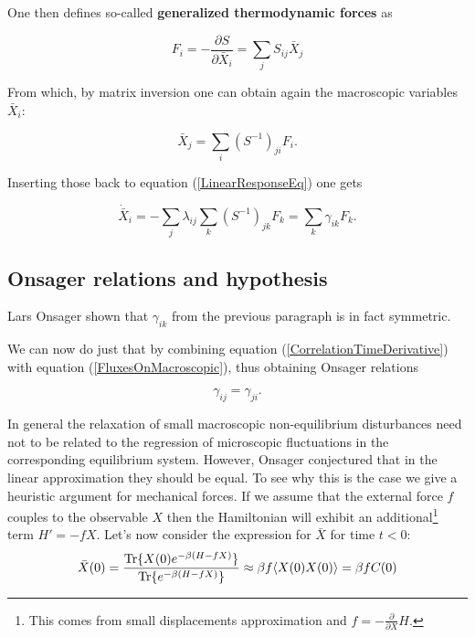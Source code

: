 \documentclass[a4paper,12pt]{article}
\begin{document}
One then defines so-called \textbf{generalized thermodynamic forces} as

\begin{equation}
  F_i= -\frac{\partial{S}}{\partial{\bar{X}_i}}= \sum_j S_{ij}\bar{X}_j
\end{equation}

From which, by matrix inversion one can obtain again the macroscopic variables $\bar{X}_i$:

\begin{equation}
  \bar{X}_j = \sum_i (S^{-1})_{ji} F_i.
\end{equation}


Inserting those back to equation (\ref{LinearResponseEq}) one gets

\begin{equation}
\label{FluxesOnMacroscopic}
  \dot{\bar{X}}_i=-\sum_j \lambda_{ij} \sum_k (S^{-1})_{jk} F_k = \sum_k \gamma_{ik} F_k.
\end{equation}

\subsection{Onsager relations and hypothesis}
\label{OnsagerRelationsSection}

Lars Onsager\cite{Onsager:zgWBDrcO} shown that $\gamma_{ik}$ from the previous paragraph is in fact symmetric.

We can now do just that by combining equation (\ref{CorrelationTimeDerivative}) with equation (\ref{FluxesOnMacroscopic}), thus obtaining Onsager relations

\begin{equation}
  \gamma_{ij}=\gamma_{ji}.
\end{equation}

In general the relaxation of small macroscopic non-equilibrium disturbances need not to be related to the regression of microscopic fluctuations in the corresponding equilibrium system. 
However, Onsager conjectured that in the linear approximation they should be equal. To see why this is the case we give a heuristic argument for mechanical forces.
If we assume that the external force $f$ couples to the observable $X$ then the Hamiltonian will exhibit an additional\footnote{This comes from small displacements approximation and $f=-\frac{\partial}{\partial{X}} H$.} term $H'=-f X$.
Let's now consider the expression for $\bar{X}$ for time $t < 0$:
\begin{equation}
  \bar{X}(0)=\frac{\Tr\{ X(0) e^{-\beta (H-f X)} \}}{\Tr\{ e^{-\beta (H-f X)} \}} \approx \beta f \langle X(0)X(0) \rangle= \beta f C(0)
\end{equation}
\end{document}
